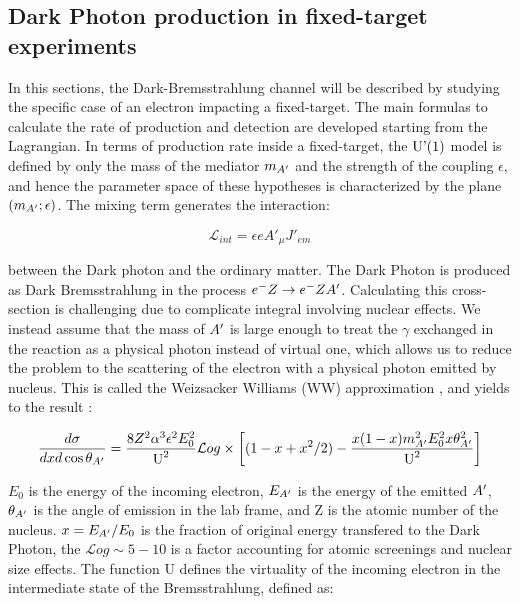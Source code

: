 \subsection{Dark Photon production in fixed-target experiments}
\label{ch1:sec:dm-u1model}

In this sections, the Dark-Bremsstrahlung channel will be described by studying the specific case of an electron impacting a fixed-target. The main formulas to calculate the rate of production and detection are developed starting from the Lagrangian. In terms of production rate inside a fixed-target, the $\textrm{U'(1)}$ model is defined by only the mass of the mediator $m_{A'}$ and the strength of the coupling $\epsilon$, and hence the parameter space of these hypotheses is characterized by the plane $(m_{A'};\epsilon)$. The mixing term generates the interaction:

\begin{equation}
  \label{eq:dm-interaction}
  \mathcal{L}_{int} = \epsilon e A'_{\mu}J'_{em}
\end{equation}

between the Dark photon and the ordinary matter. The Dark Photon is produced as Dark Bremsstrahlung in the process $e^- Z \to e^- Z A'$. Calculating this cross-section is challenging due to complicate integral involving nuclear effects. We instead assume that the mass of $A'$ is large enough to treat the $\gamma$ exchanged in the reaction as a physical photon instead of virtual one, which allows us to reduce the problem to the scattering of the electron with a physical photon emitted by nucleus. This is called the Weizsacker Williams (WW) approximation \cite{Kim:1973he}, and yields to the result \cite{jdb}:

\begin{equation}
  \label{eq:dm-diff-cross}
  \frac{d\sigma}{dxd\cos{\theta_{A'}}} = \frac{8 Z^2 \alpha^3 \epsilon^2 E^2_0}{\textrm{U}^2} \mathcal{L}og \times \left[ (1 - x + x^2/2) - \frac{x(1-x)m^2_{A'}E^2_0 x \theta^2_{A'}}{\textrm{U}^2} \right]
\end{equation}

$E_0$ is the energy of the incoming electron, $E_{A'}$ is the energy of the emitted $A'$, $\theta_{A'}$ is the angle of emission in the lab frame, and Z is the atomic number of the nucleus. $x=E_{A'}/E_0$ is the fraction of original energy transfered to the Dark Photon, the $\mathcal{L}og \sim 5 - 10$ is a factor accounting for atomic screenings and nuclear size effects. The function U defines the virtuality of the incoming electron in the intermediate state of the Bremsstrahlung, defined as:

